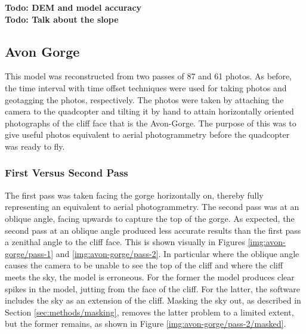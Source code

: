 \textbf{Todo: DEM and model accuracy} \\
\textbf{Todo: Talk about the slope} \\

\subsection{Avon Gorge}
\label{sec:results/avon-gorge}

This model was reconstructed from two passes of 87 and 61 photos. As before, the
time interval with time offset techniques were used for taking photos and
geotagging the photos, respectively. The photos were taken by attaching the
camera to the quadcopter and tilting it by hand to attain horizontally oriented
photographs of the cliff face that is the Avon-Gorge. The purpose of this was to
give useful photos equivalent to aerial photogrammetry before the quadcopter was
ready to fly.

\subsubsection{First Versus Second Pass}

The first pass was taken facing the gorge horizontally on, thereby fully
representing an equivalent to aerial photogrammetry. The second pass was at an
oblique angle, facing upwards to capture the top of the gorge. As expected, the
second pass at an oblique angle produced less accurate results than the first
pass a zenithal angle to the cliff face. This is shown visually in Figures
\ref{img:avon-gorge/pass-1} and \ref{img:avon-gorge/pass-2}. In particular where
the oblique angle causes the camera to be unable to see the top of the cliff and
where the cliff meets the sky, the model is erroneous. For the former the model
produces clear spikes in the model, jutting from the face of the cliff. For the
latter, the software includes the sky as an extension of the cliff. Masking the
sky out, as described in Section \ref{sec:methods/masking}, removes the latter
problem to a limited extent, but the former remains, as shown in Figure
\ref{img:avon-gorge/pass-2/masked}.

